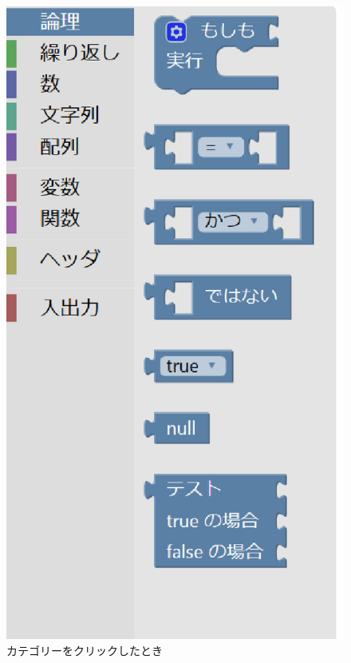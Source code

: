 \documentclass{eniepaper}
\begin{document}
\begin{figure}[h]
\begin{center}
\includegraphics[scale=0.3]{img/blockmenu_open.eps}
\caption{カテゴリーをクリックしたとき}%
\label{fig:blockmenu_open}
\end{center}%
\end{figure}%

   \newpage
\end{document}
